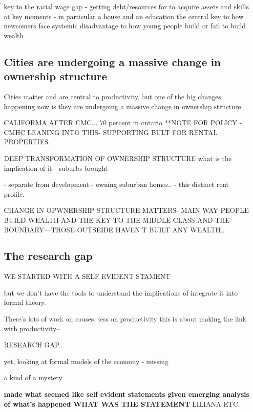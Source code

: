 key to the racial wage gap - getting debt/resources for to acquire assets and skills at key moments - in particular a house and an education the central
key to how newcomers face systemic disadvantage
to how young people build or fail to build wealth




\subsection{Cities are undergoing a massive change in ownership structure}

Cities matter and are central to productivity, but one of the big changes happening now is they are undergoing a massive change in ownership structure. 

CALIFORMA AFTER CMC... 
70 percent in ontario 
**NOTE FOR POLICY - CMHC LEANING INTO THIS- SUPPORTING BULT FOR RENTAL PROPERTIES. 

DEEP TRANSFORMATION OF OWNERSHIP STRUCTURE
what is the implication of it
- suburbs brought

- separate from development - owning suburban homes.. 
- this distinct rent profile.


CHANGE IN OPWNERSHIP STRUCTURE MATTERS- 
MAIN WAY PEOPLE BUILD WEALTH AND THE KEY TO THE MIDDLE CLASS
AND THE BOUNDARY---THOSE OUTSEIDE HAVEN'T BUILT ANY WEALTH..

\subsection{The research gap}

WE STARTED WITH A SELF EVIDENT STAMENT

 but we don't have the tools to understand the implications of integrate it into formal theory.
 
 There's lots of work on causes.
 less on productivity 
 this is about making the link with productivity--

RESEARCH GAP..


yet, looking at formal models of the economy - missing

a kind of a mystery


\textbf{made what seemed like self evident statements given emerging analysis of what's happened WHAT WAS THE STATEMENT} LILIANA ETC.

